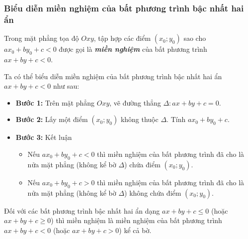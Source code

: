 \subsubsection{Biểu diễn miền nghiệm của bất phương trình bậc nhất hai ẩn}
\begin{boxdn}
	Trong mặt phẳng tọa độ $Oxy$, tập hợp các điểm $(x_0;y_0)$ sao cho $ax_0+by_0+c<0$ được gọi là \textbf{\textit{miền nghiệm}} của bất phương trình $ax+by+c<0$.
\end{boxdn}
Ta có thể biểu diễn miền nghiệm của bất phương trình bậc nhất hai ẩn $ax+by+c<0$ như sau:
\begin{itemize}
	\item \textbf{Bước 1:} Trên mặt phẳng $Oxy$, vẽ đường thẳng $\Delta\colon ax+by+c=0$.
	\item \textbf{Bước 2:} Lấy một điểm $(x_0;y_0)$ không thuộc $\Delta$. Tính $ax_0+by_0+c$.
	\item \textbf{Bước 3:} Kết luận
	\begin{itemize}
	\item Nếu $ax_0+by_0+c<0$ thì miền nghiệm của bất phương trình đã cho là nửa mặt phẳng (không kể bờ $\Delta$) chứa điểm $(x_0;y_0)$.
	\item Nếu $ax_0+by_0+c>0$ thì miền nghiệm của bất phương trình đã cho là nửa mặt phẳng (không kể bờ $\Delta$) không chứa điểm $(x_0;y_0)$.
	\end{itemize}
\end{itemize}
\begin{note}
	Đối với các bất phương trình bậc nhất hai ẩn dạng $ax+by+c \le 0$ (hoặc $ax+by+c \ge 0$) thì miền nghiệm là miền nghiệm của bất phương trình $ax+by+c < 0$ (hoặc $ax+by+c > 0$) kể cả bờ.
\end{note}
